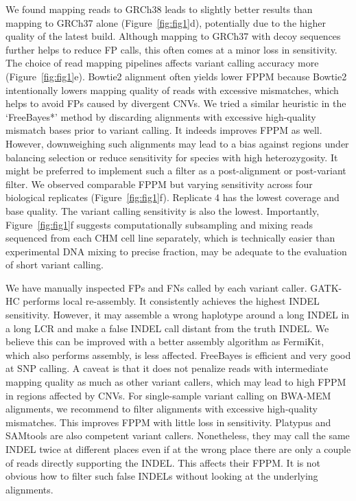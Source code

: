 \documentclass{bioinfo}
\begin{document}
We found mapping reads to GRCh38 leads to slightly better results than mapping
to GRCh37 alone (Figure~\ref{fig:fig1}d), potentially due to the higher quality
of the latest build. Although mapping to GRCh37 with decoy sequences further
helps to reduce FP calls, this often comes at a minor loss in sensitivity.
The choice of read mapping pipelines affects variant calling accuracy more
(Figure~\ref{fig:fig1}e). Bowtie2 alignment often yields lower FPPM because
Bowtie2 intentionally lowers mapping quality of reads with excessive
mismatches, which helps to avoid FPs caused by divergent CNVs.  We tried a
similar heuristic in the `FreeBayes*' method by discarding alignments with
excessive high-quality mismatch bases prior to variant calling. It indeeds
improves FPPM as well.  However, downweighing such alignments may lead to a
bias against regions under balancing selection or reduce sensitivity for
species with high heterozygosity. It might be preferred to implement such a
filter as a post-alignment or post-variant filter. We observed comparable
FPPM but varying sensitivity across four biological replicates
(Figure~\ref{fig:fig1}f). Replicate 4 has the lowest coverage and base quality.
The variant calling sensitivity is also the lowest. Importantly,
Figure~\ref{fig:fig1}f suggests computationally subsampling and mixing reads
sequenced from each CHM cell line separately, which is technically easier than
experimental DNA mixing to precise fraction, may be adequate to the evaluation
of short variant calling.

We have manually inspected FPs and FNs called by each variant caller. GATK-HC
performs local re-assembly. It consistently achieves the highest INDEL
sensitivity.  However, it may assemble a wrong haplotype around a long INDEL in
a long LCR and make a false INDEL call distant from the truth INDEL. We believe
this can be improved with a better assembly algorithm as FermiKit, which also
performs assembly, is less affected.  FreeBayes is efficient and very good at
SNP calling. A caveat is that it does not penalize reads with intermediate
mapping quality as much as other variant callers, which may lead to high
FPPM in regions affected by CNVs.  For single-sample variant calling on
BWA-MEM alignments, we recommend to filter alignments with excessive
high-quality mismatches. This improves FPPM with little loss in sensitivity.
Platypus and SAMtools are also competent variant callers. Nonetheless, they may
call the same INDEL twice at different places even if at the wrong place there
are only a couple of reads directly supporting the INDEL. This affects their
FPPM.  It is not obvious how to filter such false INDELs without looking at the
underlying alignments.
\end{document}
